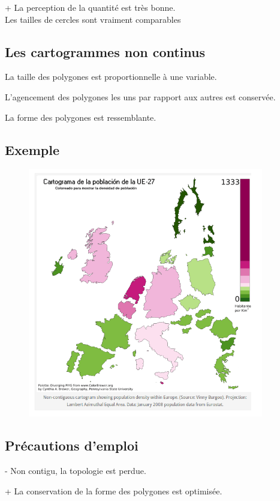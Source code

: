 \documentclass[]{book}
\begin{document}
+ La perception de la quantité est très bonne.\\
Les tailles de cercles sont vraiment comparables

\subsection{Les cartogrammes non
continus}\label{les-cartogrammes-non-continus}

La taille des polygones est proportionnelle à une variable.

L'agencement des polygones les uns par rapport aux autres est conservée.

La forme des polygones est ressemblante.

\subsection{Exemple}\label{exemple-1}

\begin{figure}
\centering
\includegraphics{img/nc.png}
\caption{}
\end{figure}

\subsection{Précautions d'emploi}\label{precautions-demploi-1}

- Non contigu, la topologie est perdue.

+ La conservation de la forme des polygones est optimisée.
\end{document}
